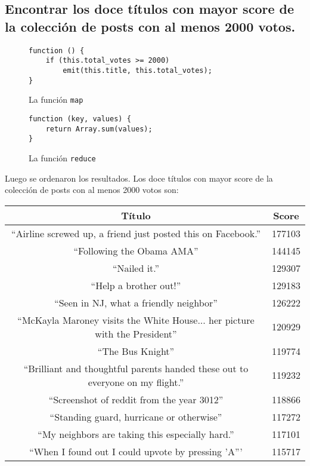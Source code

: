 \documentclass[11pt, a4paper, twoside]{article}
\begin{document}
\subsection{Encontrar los doce títulos con mayor score de la colección de posts con al menos 2000 votos.}

\begin{figure}[H]
\centering
\begin{verbatim}
function () {
    if (this.total_votes >= 2000)
        emit(this.title, this.total_votes);
}
\end{verbatim}
\caption{La función \texttt{map}}
\end{figure}

\begin{figure}[H]
\centering
\begin{verbatim}
function (key, values) {
    return Array.sum(values);
}
\end{verbatim}
\caption{La función \texttt{reduce}}
\end{figure}

Luego se ordenaron los resultados. Los doce títulos con mayor score de la colección de posts con al menos 2000 votos son:


\begin{center}
  \begin{tabular}{c|c}
    \textbf{Título} & \textbf{Score} \\ \hline
    ``Airline screwed up, a friend just posted this on Facebook.'' & 177103 \\
    ``Following the Obama AMA'' & 144145 \\
    ``Nailed it.'' & 129307 \\
    ``Help a brother out!'' & 129183 \\
    ``Seen in NJ, what a friendly neighbor'' & 126222 \\
    ``McKayla Maroney visits the White House... her picture with the President'' & 120929 \\
    ``The Bus Knight'' & 119774 \\
    ``Brilliant and thoughtful parents handed these out to everyone on my flight.'' & 119232 \\
    ``Screenshot of reddit from the year 3012'' & 118866 \\
    ``Standing guard, hurricane or otherwise'' & 117272 \\
    ``My neighbors are taking this especially hard.'' & 117101 \\
    ``When I found out I could upvote by pressing 'A''' & 115717

  \end{tabular}
\end{center}
\end{document}
